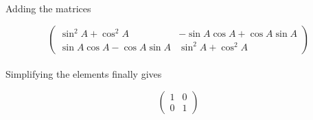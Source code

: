 \documentclass[journal,12pt,twocolumn]{IEEEtran}
\newcommand{\myvec}[1]{\ensuremath{\begin{pmatrix}#1\end{pmatrix}}}
\begin{document}
Adding the matrices

\begin{equation}
	\myvec{\sin^2 A + \cos^2 A &  -\sin A \cos A +\cos A \sin A \\ \sin A \cos A -\cos A \sin A & \sin^2 A + \cos^2 A}
\end{equation}\\

Simplifying the elements finally gives

\begin{equation}
	\myvec{1 & 0 \\ 0 & 1}
\end{equation}\\
\end{document}
